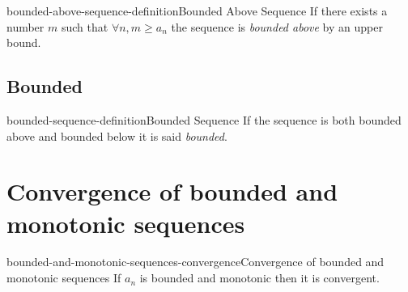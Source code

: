 \documentclass[preview]{standalone}
\begin{document}
\begin{snippetdefinition}{bounded-above-sequence-definition}{Bounded Above Sequence}{
    If there exists a number \(m\) such that \(\forall n, m \geq a_n\)
    the sequence is \textit{bounded above} by an upper bound.
}
\end{snippetdefinition}

\subsection{Bounded}

\begin{snippetdefinition}{bounded-sequence-definition}{Bounded Sequence}{
    If the sequence is both bounded above and bounded below it is
    said \textit{bounded}.
}
\end{snippetdefinition}

\section{Convergence of bounded and monotonic sequences}

\begin{snippettheorem}{bounded-and-monotonic-sequences-convergence}{Convergence of bounded and monotonic sequences}{
    If \(a_n\) is bounded and monotonic then it is convergent.
}
\end{snippettheorem}
\end{document}
